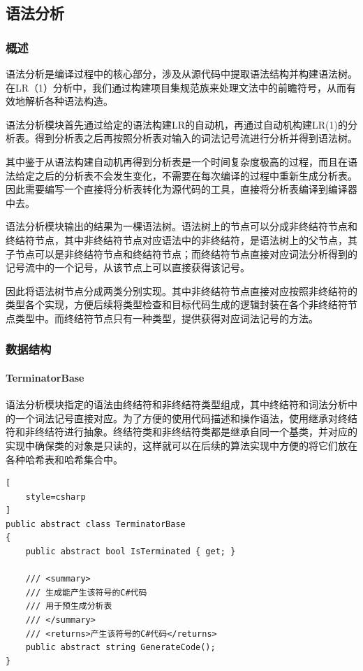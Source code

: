 \documentclass[../main.tex]{subfiles}
\begin{document}
\subsection{语法分析}

\subsubsection{概述}

语法分析是编译过程中的核心部分，涉及从源代码中提取语法结构并构建语法树。在LR（1）分析中，我们通过构建项目集规范族来处理文法中的前瞻符号，从而有效地解析各种语法构造。

语法分析模块首先通过给定的语法构建LR的自动机，再通过自动机构建LR(1)的分析表。得到分析表之后再按照分析表对输入的词法记号流进行分析并得到语法树。

其中鉴于从语法构建自动机再得到分析表是一个时间复杂度极高的过程，而且在语法给定之后的分析表不会发生变化，不需要在每次编译的过程中重新生成分析表。因此需要编写一个直接将分析表转化为源代码的工具，直接将分析表编译到编译器中去。

语法分析模块输出的结果为一棵语法树。语法树上的节点可以分成非终结符节点和终结符节点，其中非终结符节点对应语法中的非终结符，是语法树上的父节点，其子节点可以是非终结符节点和终结符节点；而终结符节点直接对应词法分析得到的记号流中的一个记号，从该节点上可以直接获得该记号。

因此将语法树节点分成两类分别实现。其中非终结符节点直接对应按照非终结符的类型各个实现，方便后续将类型检查和目标代码生成的逻辑封装在各个非终结符节点类型中。而终结符节点只有一种类型，提供获得对应词法记号的方法。

\subsubsection{数据结构}

\paragraph{TerminatorBase} 语法分析模块指定的语法由终结符和非终结符类型组成，其中终结符和词法分析中的一个词法记号直接对应。为了方便的使用代码描述和操作语法，使用继承对终结符和非终结符进行抽象。终结符类和非终结符类都是继承自同一个基类，并对应的实现中确保类的对象是只读的，这样就可以在后续的算法实现中方便的将它们放在各种哈希表和哈希集合中。

\begin{lstlisting}[
    style=csharp
]
public abstract class TerminatorBase
{
    public abstract bool IsTerminated { get; }

    /// <summary>
    /// 生成能产生该符号的C#代码
    /// 用于预生成分析表
    /// </summary>
    /// <returns>产生该符号的C#代码</returns>
    public abstract string GenerateCode();
}
\end{lstlisting}
\end{document}
